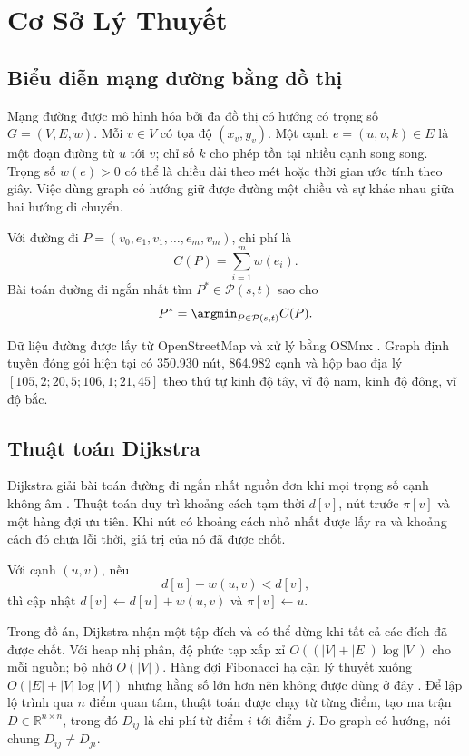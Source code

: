 \chapter{Cơ Sở Lý Thuyết}

\section{Biểu diễn mạng đường bằng đồ thị}

Mạng đường được mô hình hóa bởi đa đồ thị có hướng có trọng số
$G=(V,E,w)$. Mỗi $v\in V$ có tọa độ $(x_v,y_v)$. Một cạnh
$e=(u,v,k)\in E$ là một đoạn đường từ $u$ tới $v$; chỉ số $k$ cho phép tồn tại
nhiều cạnh song song. Trọng số $w(e)>0$ có thể là chiều dài theo mét hoặc thời
gian ước tính theo giây. Việc dùng graph có hướng giữ được đường một chiều và sự
khác nhau giữa hai hướng di chuyển.

\begin{formulabox}[title={Chi phí của một đường đi}]
Với đường đi $P=(v_0,e_1,v_1,\ldots,e_m,v_m)$, chi phí là
\[
  C(P)=\sum_{i=1}^{m} w(e_i).
\]
Bài toán đường đi ngắn nhất tìm $P^*\in\mathcal{P}(s,t)$ sao cho
\[
  P^*=\argmin_{P\in\mathcal{P}(s,t)} C(P).
\]
\end{formulabox}

Dữ liệu đường được lấy từ OpenStreetMap và xử lý bằng OSMnx
\cite{openstreetmap,boeing2017}. Graph định tuyến đóng gói hiện tại có 350.930
nút, 864.982 cạnh và hộp bao địa lý $[105{,}2;20{,}5;106{,}1;21{,}45]$ theo thứ
tự kinh độ tây, vĩ độ nam, kinh độ đông, vĩ độ bắc.

\section{Thuật toán Dijkstra}

Dijkstra giải bài toán đường đi ngắn nhất nguồn đơn khi mọi trọng số cạnh không
âm \cite{dijkstra1959,cormen2009}. Thuật toán duy trì khoảng cách tạm thời $d[v]$, nút trước
$\pi[v]$ và một hàng đợi ưu tiên. Khi nút có khoảng cách nhỏ nhất được lấy ra và
khoảng cách đó chưa lỗi thời, giá trị của nó đã được chốt.

\begin{formulabox}[title={Phép nới lỏng cạnh}]
Với cạnh $(u,v)$, nếu
\[
  d[u]+w(u,v)<d[v],
\]
thì cập nhật $d[v]\leftarrow d[u]+w(u,v)$ và $\pi[v]\leftarrow u$.
\end{formulabox}

Trong đồ án, Dijkstra nhận một tập đích và có thể dừng khi tất cả các đích đã
được chốt. Với heap nhị phân, độ phức tạp xấp xỉ
$O((|V|+|E|)\log |V|)$ cho mỗi nguồn; bộ nhớ $O(|V|)$. Hàng đợi Fibonacci hạ cận
lý thuyết xuống $O(|E|+|V|\log|V|)$ nhưng hằng số lớn hơn nên không được dùng ở
đây \cite{fredman1987}. Để lập lộ trình qua
$n$ điểm quan tâm, thuật toán được chạy từ từng điểm, tạo ma trận
$D\in\mathbb{R}^{n\times n}$, trong đó $D_{ij}$ là chi phí từ điểm $i$ tới
điểm $j$. Do graph có hướng, nói chung $D_{ij}\neq D_{ji}$.

